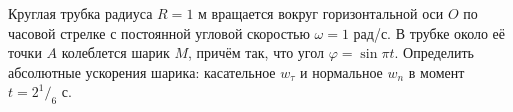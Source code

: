 Круглая трубка радиуса $R = 1$ м вращается вокруг горизонтальной оси $O$
по часовой стрелке с постоянной угловой скоростью $\omega = 1$ рад/с.
В трубке около её точки $A$ колеблется шарик $M$,
причём так, что угол $\varphi = \sin{\pi t}$.
Определить абсолютные ускорения шарика:
касательное $w_{\tau}$ и нормальное $w_n$
в момент $t = 2 ^1/_6$ с.
